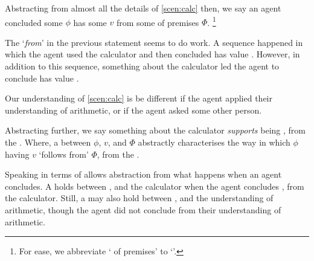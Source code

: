 \begin{note}
  Abstracting from almost all the details of \autoref{scen:calc} then, we say an agent concluded some \prop{} \(\phi\) has some \val{} \(v\) from some \pool{} of premises \(\Phi\).%
  \footnote{
    For ease, we abbreviate `\pool{} of premises' to `\pool{}'.
  }

  The `\emph{from}' in the previous statement seems to do work.
  A sequence happened in which the agent used the calculator and then concluded \propM{\gistCalcEq{}} has value .
  However, in addition to this sequence, something about the calculator led the agent to conclude \propM{\gistCalcEq{}} has value .

  Our understanding of \autoref{scen:calc} is be different if the agent applied their understanding of arithmetic, or if the agent asked some other person.
\end{note}

\begin{note}
  Abstracting further, we say something about the calculator \emph{supports} \propM{\gistCalcEq{}} being , from the \agpe{}.
  Where, a \ros{} between \(\phi\), \(v\), and \(\Phi\) abstractly characterises the way in which \(\phi\) having  \(v\) `follows from' \(\Phi\), from the \agpe{}.

  Speaking in terms of  allows abstraction from what happens when an agent concludes.
  A \ros{} holds between \propM{\gistCalcEq{}},  and the calculator when the agent concludes \propM{\gistCalcEq{}},  from the calculator.
  Still, a \ros{} may also hold between \propM{\gistCalcEq{}},  and the \agents{} understanding of arithmetic, though the agent did not conclude from their understanding of arithmetic.
\end{note}

